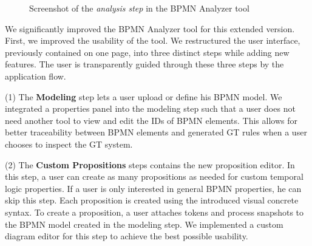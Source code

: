 \documentclass{lmcs} %
\begin{document}
\begin{figure}[ht]
    \centering
    \caption{Screenshot of the \textit{analysis step} in the BPMN Analyzer tool}
    \label{fig:implScreenshot}
\end{figure}

We significantly improved the BPMN Analyzer tool for this extended version.
First, we improved the usability of the tool.
We restructured the user interface, previously contained on one page, into three distinct steps while adding new features.
The user is transparently guided through these three steps by the application flow.

(1) The \textbf{Modeling} step lets a user upload or define his BPMN model.
We integrated a properties panel into the modeling step such that a user does not need another tool to view and edit the IDs of BPMN elements.
This allows for better traceability between BPMN elements and generated GT rules when a user chooses to inspect the GT system.

(2) The \textbf{Custom Propositions} steps contains the new proposition editor.
In this step, a user can create as many propositions as needed for custom temporal logic properties.
If a user is only interested in general BPMN properties, he can skip this step.
Each proposition is created using the introduced visual concrete syntax.
To create a proposition, a user attaches tokens and process snapshots to the BPMN model created in the modeling step.
We implemented a custom diagram editor for this step to achieve the best possible usability.
\end{document}
